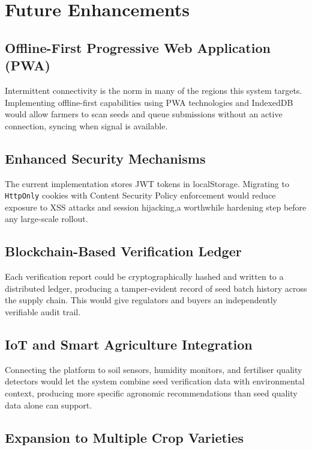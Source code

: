 \section{Future Enhancements}

\subsection{Offline-First Progressive Web Application (PWA)}

Intermittent connectivity is the norm in many of the regions this system targets. Implementing offline-first capabilities using PWA technologies and IndexedDB would allow farmers to scan seeds and queue submissions without an active connection, syncing when signal is available.

\subsection{Enhanced Security Mechanisms}

The current implementation stores JWT tokens in localStorage. Migrating to \texttt{HttpOnly} cookies with Content Security Policy enforcement would reduce exposure to XSS attacks and session hijacking,a worthwhile hardening step before any large-scale rollout.

\subsection{Blockchain-Based Verification Ledger}

Each verification report could be cryptographically hashed and written to a distributed ledger, producing a tamper-evident record of seed batch history across the supply chain. This would give regulators and buyers an independently verifiable audit trail.

\subsection{IoT and Smart Agriculture Integration}

Connecting the platform to soil sensors, humidity monitors, and fertiliser quality detectors would let the system combine seed verification data with environmental context, producing more specific agronomic recommendations than seed quality data alone can support.

\subsection{Expansion to Multiple Crop Varieties}

